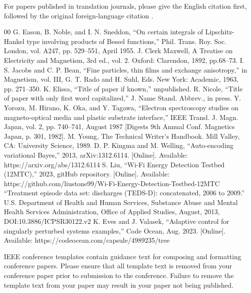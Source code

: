 \documentclass[conference]{IEEEtran}
\begin{document}
For papers published in translation journals, please give the English 
citation first, followed by the original foreign-language citation \cite{b6}.

\begin{thebibliography}{00}
 G. Eason, B. Noble, and I. N. Sneddon, ``On certain integrals of Lipschitz-Hankel type involving products of Bessel functions,'' Phil. Trans. Roy. Soc. London, vol. A247, pp. 529--551, April 1955.
 J. Clerk Maxwell, A Treatise on Electricity and Magnetism, 3rd ed., vol. 2. Oxford: Clarendon, 1892, pp.68--73.
 I. S. Jacobs and C. P. Bean, ``Fine particles, thin films and exchange anisotropy,'' in Magnetism, vol. III, G. T. Rado and H. Suhl, Eds. New York: Academic, 1963, pp. 271--350.
 K. Elissa, ``Title of paper if known,'' unpublished.
 R. Nicole, ``Title of paper with only first word capitalized,'' J. Name Stand. Abbrev., in press.
 Y. Yorozu, M. Hirano, K. Oka, and Y. Tagawa, ``Electron spectroscopy studies on magneto-optical media and plastic substrate interface,'' IEEE Transl. J. Magn. Japan, vol. 2, pp. 740--741, August 1987 [Digests 9th Annual Conf. Magnetics Japan, p. 301, 1982].
 M. Young, The Technical Writer's Handbook. Mill Valley, CA: University Science, 1989.
 D. P. Kingma and M. Welling, ``Auto-encoding variational Bayes,'' 2013, arXiv:1312.6114. [Online]. Available: https://arxiv.org/abs/1312.6114
 S. Liu, ``Wi-Fi Energy Detection Testbed (12MTC),'' 2023, gitHub repository. [Online]. Available: https://github.com/liustone99/Wi-Fi-Energy-Detection-Testbed-12MTC
 ``Treatment episode data set: discharges (TEDS-D): concatenated, 2006 to 2009.'' U.S. Department of Health and Human Services, Substance Abuse and Mental Health Services Administration, Office of Applied Studies, August, 2013, DOI:10.3886/ICPSR30122.v2
 K. Eves and J. Valasek, ``Adaptive control for singularly perturbed systems examples,'' Code Ocean, Aug. 2023. [Online]. Available: https://codeocean.com/capsule/4989235/tree
\end{thebibliography}

\vspace{12pt}
\color{red}
IEEE conference templates contain guidance text for composing and formatting conference papers. Please ensure that all template text is removed from your conference paper prior to submission to the conference. Failure to remove the template text from your paper may result in your paper not being published.
\end{document}
